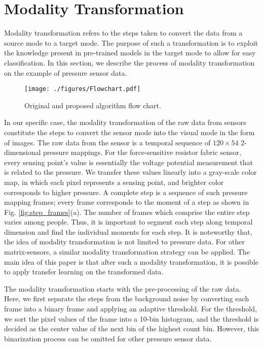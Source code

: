 \section{Modality Transformation}
	\label{sec:mod}
Modality transformation refers to the steps taken to convert the data from a source mode to a target mode. The purpose of such a transformation is to exploit the knowledge present in pre-trained models in the target mode to allow for easy classification. In this section, we describe the process of modality transformation on the example of pressure sensor data.

\begin{figure}
	\centering
		\texttt{[image: ./figures/Flowchart.pdf]}
	\caption{Original and proposed algorithm flow chart.}
	\label{fig:flowchart}
\end{figure}

%
In our specific case, the modality transformation of the raw data from sensors constitute the steps to convert the sensor mode into the visual mode in the form of images. The raw data from the sensor is a temporal sequence of $120 \times 54$ 2-dimensional pressure mappings. For the force-sensitive resistor fabric sensor, every sensing point's value is essentially the voltage potential measurement that is related to the pressure. We transfer these values linearly into a gray-scale color map, in which each pixel represents a sensing point, and brighter color corresponds to higher pressure. A complete step is a sequence of such pressure mapping frames; every frame corresponds to the moment of a step as shown in Fig. \ref{fig:step_frames}(a). The number of frames which comprise the entire step varies among people. Thus, it is important to segment each step along temporal dimension and find the individual moments for each step. It is noteworthy that, the idea of modality transformation is not limited to pressure data. For other matrix-sensors, a similar modality transformation strategy can be applied. The main idea of this paper is that after such a modality transformation, it is possible to apply transfer learning on the transformed data.



The modality transformation starts with the pre-processing of the raw data. Here, we first separate the steps from the background noise by converting each frame into a binary frame and applying an adaptive threshold. For the threshold, we sort the pixel values of the frame into a 10-bin histogram, and the threshold is decided as the center value of the next bin of the highest count bin.  However, this binarization process can be omitted for other pressure sensor data.

